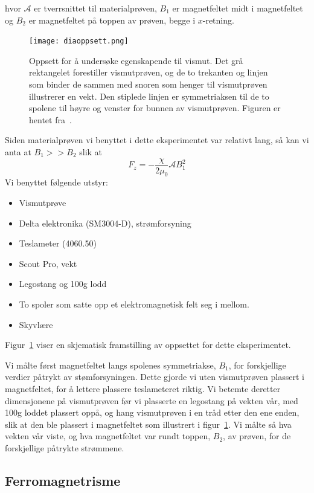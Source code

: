\documentclass[a4paper,11pt, twocolumn]{article}
\begin{document}
hvor $\mathcal{A}$ er tverrsnittet til materialprøven, $B_1$ er magnetfeltet midt i magnetfeltet og $B_2$ er magnetfeltet på toppen av prøven, begge i $x$-retning.

\begin{figure}[!ht]
	\centering
	\texttt{[image: diaoppsett.png]}
	\caption{Oppsett for å undersøke egenskapende til vismut. Det grå rektangelet forestiller vismutprøven, og de to trekanten og linjen som binder de sammen med snoren som henger til vismutprøven illustrerer en vekt. Den stiplede linjen er symmetriaksen til de to spolene til høyre og venster for bunnen av vismutprøven. Figuren er hentet fra~\cite{fys1120}.}
	\label{fig:diaoppsett}
\end{figure}
Siden materialprøven vi benyttet i dette eksperimentet var relativt lang, så kan vi anta at $B_1>>B_2$ slik at 
\begin{equation}
	F_z = -\frac{\chi}{2\mu_0}\mathcal{A}B_1^2
	\label{eq:diaForenklet}
\end{equation}
Vi benyttet følgende utstyr:
\begin{itemize}
	\item Vismutprøve
	\item Delta elektronika (SM3004-D), strømforsyning
	\item Teslameter (4060.50)
	\item Scout Pro, vekt
	\item Legostang og 100g lodd 
	\item To spoler som satte opp et elektromagnetisk felt seg i mellom.
	\item Skyvlære
\end{itemize}
Figur~\ref{fig:diaoppsett} viser en skjematisk framstilling av oppsettet for dette eksperimentet.

Vi målte først magnetfeltet langs spolenes symmetriakse, $B_1$, for forskjellige verdier påtrykt av stømforsyningen. Dette gjorde vi uten vismutprøven plassert i magnetfeltet, for å lettere plassere teslameteret riktig. Vi betemte deretter dimensjonene på vismutprøven før vi plasserte en legostang på vekten vår, med 100g loddet plassert oppå, og hang vismutprøven i en tråd etter den ene enden, slik at den ble plassert i magnetfeltet som illustrert i figur~\ref{fig:diaoppsett}. Vi målte så hva vekten vår viste, og hva magnetfeltet var rundt toppen, $B_2$, av prøven, for de forskjellige påtrykte strømmene.
\subsection{Ferromagnetrisme}
\end{document}
